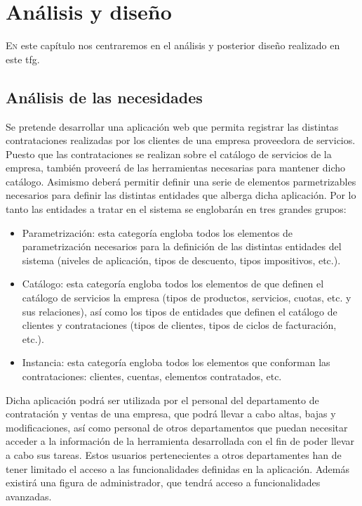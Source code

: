 \chapter{Análisis y diseño}
\label{chap:analisis-disenho}


\lettrine{E}{n} este capítulo nos centraremos en el análisis y posterior diseño realizado en este \acrshort{tfg}.

\section{Análisis de las necesidades}
\label{sec:analisis}
Se pretende desarrollar una aplicación web que permita registrar las distintas contrataciones realizadas por los clientes de una empresa proveedora de servicios. Puesto que las contrataciones se realizan sobre el catálogo de servicios de la empresa, también proveerá de las herramientas necesarias para mantener dicho catálogo. Asimismo deberá permitir definir una serie de elementos parmetrizables necesarios para definir las distintas entidades que alberga dicha aplicación. Por lo tanto las entidades a tratar en el sistema se englobarán en tres grandes grupos:


\begin{itemize}
\item Parametrización: esta categoría engloba todos los elementos de parametrización necesarios para la definición de las distintas entidades del sistema (niveles de aplicación, tipos de descuento, tipos impositivos, etc.).
\item Catálogo: esta categoría engloba todos los elementos de que definen el catálogo de servicios la empresa (tipos de productos, servicios, cuotas, etc. y sus relaciones), así como los tipos de entidades que definen el catálogo de clientes y contrataciones (tipos de clientes, tipos de ciclos de facturación, etc.).
\item Instancia: esta categoría engloba todos los elementos que conforman las contrataciones: clientes, cuentas, elementos contratados, etc.
\end{itemize}


Dicha aplicación podrá ser utilizada por el personal del departamento de contratación y ventas de una empresa, que podrá llevar a cabo altas, bajas y modificaciones, así como personal de otros departamentos que puedan necesitar acceder a la información de la herramienta desarrollada con el fin de poder llevar a cabo sus tareas. Estos usuarios pertenecientes a otros departamentes han de tener limitado el acceso a las funcionalidades definidas en la aplicación. Además existirá una figura de administrador, que tendrá acceso a funcionalidades avanzadas.


